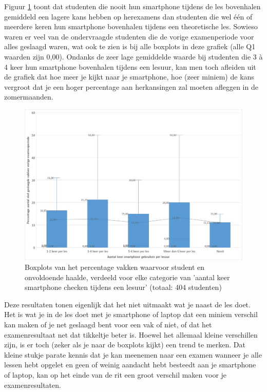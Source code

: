 Figuur \ref{fig:boxplot2} toont dat studenten die nooit hun smartphone tijdens de les bovenhalen gemiddeld een lagere kans hebben op herexamens dan studenten die wel één of meerdere keren hun smartphone bovenhalen tijdens een theoretische les. Sowieso waren er veel van de ondervraagde studenten die de vorige examenperiode voor alles geslaagd waren, wat ook te zien is bij alle boxplots in deze grafiek (alle Q1 waarden zijn 0,00). Ondanks de zeer lage gemiddelde waarde bij studenten die 3 à 4 keer hun smartphone bovenhalen tijdens een lesuur, kan men toch afleiden uit de grafiek dat hoe meer je kijkt naar je smartphone, hoe (zeer miniem) de kans vergroot dat je een hoger percentage aan herkansingen zal moeten afleggen in de zomermaanden.

\begin{figure}
	\includegraphics[width=\textwidth]
	{img/Boxplot2.jpg}
	\caption{Boxplots van het percentage vakken waarvoor student en onvoldoende haalde, verdeeld voor elke categorie van 'aantal keer smartphone checken tijdens een lesuur' (totaal: 404 studenten)}
	\label{fig:boxplot2}
\end{figure}

Deze resultaten tonen eigenlijk dat het niet uitmaakt wat je naast de les doet. Het is wat je in de les doet met je smartphone of laptop dat een miniem verschil kan maken of je net geslaagd bent voor een vak of niet, of dat het examenresultaat net dat tikkeltje beter is. Hoewel het allemaal kleine verschillen zijn, is er toch (zeker als je naar de boxplots kijkt) een trend te merken. Dat kleine stukje parate kennis dat je kan meenemen naar een examen wanneer je alle lessen hebt opgelet en geen of weinig aandacht hebt besteedt aan je smartphone of laptop, kan op het einde van de rit een groot verschil maken voor je examenresultaten.


